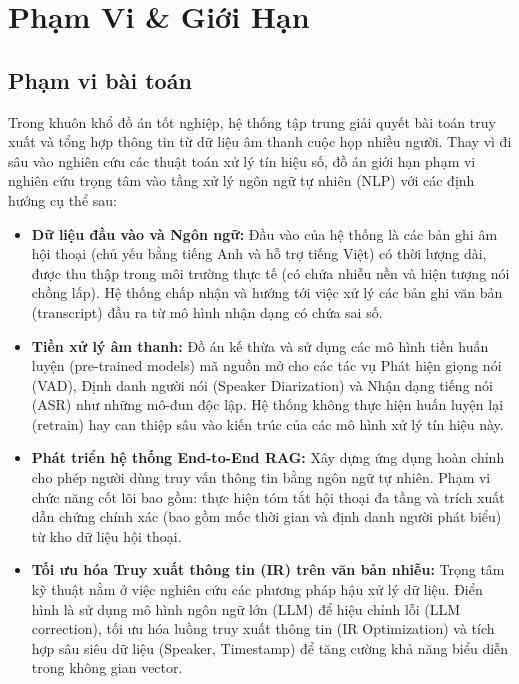 \section{Phạm Vi \& Giới Hạn}

\subsection{Phạm vi bài toán}

Trong khuôn khổ đồ án tốt nghiệp, hệ thống tập trung giải quyết bài toán truy xuất và tổng hợp thông tin từ dữ liệu âm thanh cuộc họp nhiều người. Thay vì đi sâu vào nghiên cứu các thuật toán xử lý tín hiệu số, đồ án giới hạn phạm vi nghiên cứu trọng tâm vào tầng xử lý ngôn ngữ tự nhiên (NLP) với các định hướng cụ thể sau:

\begin{itemize}[label={}]
    \item \textbf{Dữ liệu đầu vào và Ngôn ngữ:} Đầu vào của hệ thống là các bản ghi âm hội thoại (chủ yếu bằng tiếng Anh và hỗ trợ tiếng Việt) có thời lượng dài, được thu thập trong môi trường thực tế (có chứa nhiễu nền và hiện tượng nói chồng lấp). Hệ thống chấp nhận và hướng tới việc xử lý các bản ghi văn bản (transcript) đầu ra từ mô hình nhận dạng có chứa sai số.
    
    \item \textbf{Tiền xử lý âm thanh:} Đồ án kế thừa và sử dụng các mô hình tiền huấn luyện (pre-trained models) mã nguồn mở cho các tác vụ Phát hiện giọng nói (VAD), Định danh người nói (Speaker Diarization) và Nhận dạng tiếng nói (ASR) như những mô-đun độc lập. Hệ thống không thực hiện huấn luyện lại (retrain) hay can thiệp sâu vào kiến trúc của các mô hình xử lý tín hiệu này.
    
    \item \textbf{Phát triển hệ thống End-to-End RAG:} Xây dựng ứng dụng hoàn chỉnh cho phép người dùng truy vấn thông tin bằng ngôn ngữ tự nhiên. Phạm vi chức năng cốt lõi bao gồm: thực hiện tóm tắt hội thoại đa tầng và trích xuất dẫn chứng chính xác (bao gồm mốc thời gian và định danh người phát biểu) từ kho dữ liệu hội thoại.
    
    \item \textbf{Tối ưu hóa Truy xuất thông tin (IR) trên văn bản nhiễu:} Trọng tâm kỹ thuật nằm ở việc nghiên cứu các phương pháp hậu xử lý dữ liệu. Điển hình là sử dụng mô hình ngôn ngữ lớn (LLM) để hiệu chỉnh lỗi (LLM correction), tối ưu hóa luồng truy xuất thông tin (IR Optimization) và tích hợp sâu siêu dữ liệu (Speaker, Timestamp) để tăng cường khả năng biểu diễn trong không gian vector.
    

\end{itemize}
